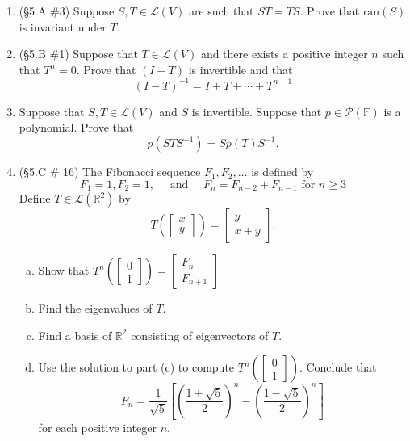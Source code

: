 \documentclass[12pt,letterpaper]{article}
\theoremstyle{plain}
\theoremstyle{definition}
\begin{document}
\begin{enumerate}[1.]
\item (\S 5.A \#3) Suppose $S,T\in \mathcal{L}(V)$ are such that $ST=TS$. Prove that $\text{ran}(S)$ is invariant under $T$. 
\item (\S5.B \#1) Suppose that $T\in \mathcal{L}(V)$ and there exists a positive integer $n$ such that $T^n=0$. Prove that $(I-T)$ is invertible and that 
\[(I-T)^{-1}=I+T+\cdots +T^{n-1}\]
\item Suppose that $S,T\in \mathcal{L}(V)$ and $S$ is invertible. Suppose that $p\in \mathcal{P}(\mathbb{F})$ is a polynomial. Prove that 
\[p(STS^{-1})=Sp(T)S^{-1}.\]
\item (\S 5.C \# 16) The Fibonacci sequence $F_1, F_2, \ldots$ is defined by 
\[F_1=1, F_2=1, \quad \text{ and }\quad F_n=F_{n-2}+F_{n-1} \text{ for }n\geq 3\]
Define $T\in \mathcal{L}(\mathbb{R}^2)$ by 
\[T \left( \left[\begin{array}{c}x\\y\end{array}\right]\right)=\left[\begin{array}{cc}y\\ x+y\end{array}\right].\]
\begin{enumerate}[(a)]
\item Show that $T^n\left(\left[\begin{array}{c}0\\1\end{array}\right]\right)=\left[\begin{array}{c}F_n\\F_{n+1}\end{array}\right]$
\item Find the eigenvalues of $T$.
\item Find a basis of $\mathbb{R}^2$ consisting of eigenvectors of $T$. 
\item Use the solution to part (c) to compute $T^n\left(\left[\begin{array}{c}0\\1\end{array}\right]\right)$. Conclude that 
\[F_n=\frac{1}{\sqrt{5}}\left[\left(\frac{1+\sqrt{5}}{2}\right)^n-\left(\frac{1-\sqrt{5}}{2}\right)^n\right]\]
for each positive integer $n$. 
\end{enumerate}
\end{enumerate}
\end{document}
